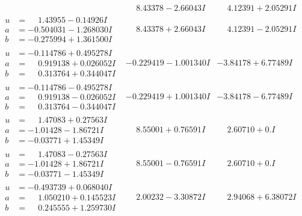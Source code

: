 \documentclass[1p]{elsarticle_modified}
\theoremstyle{definition}
\begin{document}
$$\begin{array}{c|c|c}
 & \phantom{-}8.43378 - 2.66043 I & \phantom{-}4.12391 + 2.05291 I \\ \hline\begin{aligned}
u &= \phantom{-}1.43955 - 0.14926 I \\
a &= -0.504031 - 1.268030 I \\
b &= -0.275994 + 1.361500 I\end{aligned}
 & \phantom{-}8.43378 + 2.66043 I & \phantom{-}4.12391 - 2.05291 I \\ \hline\begin{aligned}
u &= -0.114786 + 0.495278 I \\
a &= \phantom{-}0.919138 + 0.026052 I \\
b &= \phantom{-}0.313764 + 0.344047 I\end{aligned}
 & -0.229419 - 1.001340 I & -3.84178 + 6.77489 I \\ \hline\begin{aligned}
u &= -0.114786 - 0.495278 I \\
a &= \phantom{-}0.919138 - 0.026052 I \\
b &= \phantom{-}0.313764 - 0.344047 I\end{aligned}
 & -0.229419 + 1.001340 I & -3.84178 - 6.77489 I \\ \hline\begin{aligned}
u &= \phantom{-}1.47083 + 0.27563 I \\
a &= -1.01428 - 1.86721 I \\
b &= -0.03771 + 1.45349 I\end{aligned}
 & \phantom{-}8.55001 + 0.76591 I & \phantom{-}2.60710 + 0. I\phantom{ +0.000000I} \\ \hline\begin{aligned}
u &= \phantom{-}1.47083 - 0.27563 I \\
a &= -1.01428 + 1.86721 I \\
b &= -0.03771 - 1.45349 I\end{aligned}
 & \phantom{-}8.55001 - 0.76591 I & \phantom{-}2.60710 + 0. I\phantom{ +0.000000I} \\ \hline\begin{aligned}
u &= -0.493739 + 0.068040 I \\
a &= \phantom{-}1.050210 + 0.145523 I \\
b &= \phantom{-}0.245555 + 1.259730 I\end{aligned}
 & \phantom{-}2.00232 - 3.30872 I & \phantom{-}2.94068 + 6.38072 I \\ \hline\begin{aligned}

\end{aligned}
\end{array}$$
\end{document}
